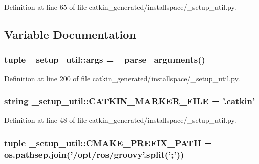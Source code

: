 \-Definition at line 65 of file catkin\-\_\-generated/installspace/\-\_\-setup\-\_\-util.\-py.



\subsection{\-Variable \-Documentation}
\subsubsection[{args}]{\setlength{\rightskip}{0pt plus 5cm}tuple {\bf \-\_\-setup\-\_\-util\-::args} = {\bf \-\_\-parse\-\_\-arguments}()}\label{namespace__setup__util_ac67cb2d93e0636936bcbeb363e2c87c3}


\-Definition at line 200 of file catkin\-\_\-generated/installspace/\-\_\-setup\-\_\-util.\-py.

\subsubsection[{\-C\-A\-T\-K\-I\-N\-\_\-\-M\-A\-R\-K\-E\-R\-\_\-\-F\-I\-L\-E}]{\setlength{\rightskip}{0pt plus 5cm}string {\bf \-\_\-setup\-\_\-util\-::\-C\-A\-T\-K\-I\-N\-\_\-\-M\-A\-R\-K\-E\-R\-\_\-\-F\-I\-L\-E} = '.catkin'}\label{namespace__setup__util_a3fa0ca5a460a71a43cbc3d4954ab1f10}


\-Definition at line 48 of file catkin\-\_\-generated/installspace/\-\_\-setup\-\_\-util.\-py.

\subsubsection[{\-C\-M\-A\-K\-E\-\_\-\-P\-R\-E\-F\-I\-X\-\_\-\-P\-A\-T\-H}]{\setlength{\rightskip}{0pt plus 5cm}tuple {\bf \-\_\-setup\-\_\-util\-::\-C\-M\-A\-K\-E\-\_\-\-P\-R\-E\-F\-I\-X\-\_\-\-P\-A\-T\-H} = os.\-pathsep.\-join('/opt/ros/groovy'.split(';'))}\label{namespace__setup__util_a44bed5f85daa4641b3c144edb9e8c1c1}


